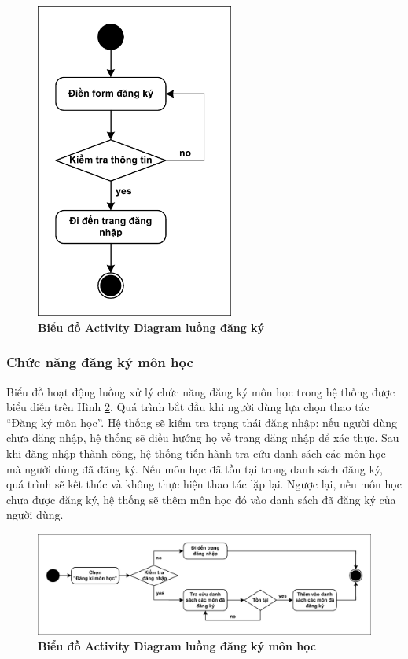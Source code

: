 \documentclass{article}
\begin{document}
	\begin{figure}[!ht]
		\centering
		\includegraphics[trim= 10pt 10pt 10pt 10pt, clip, width=6.5cm]{activity_fig310.pdf}
		\caption [Biểu đồ Activity Diagram luồng đăng ký]{\bfseries \fontsize{12pt}{0pt}\selectfont Biểu đồ Activity Diagram luồng đăng ký}
		\label{fig310}
	\end{figure}
	
	\subsubsection{Chức năng đăng ký môn học}
	
	Biểu đồ hoạt động luồng xử lý chức năng đăng ký môn học trong hệ thống được biểu diễn trên Hình \ref{fig311}. Quá trình bắt đầu khi người dùng lựa chọn thao tác “Đăng ký môn học”. Hệ thống sẽ kiểm tra trạng thái đăng nhập: nếu người dùng chưa đăng nhập, hệ thống sẽ điều hướng họ về trang đăng nhập để xác thực. Sau khi đăng nhập thành công, hệ thống tiến hành tra cứu danh sách các môn học mà người dùng đã đăng ký. Nếu môn học đã tồn tại trong danh sách đăng ký, quá trình sẽ kết thúc và không thực hiện thao tác lặp lại. Ngược lại, nếu môn học chưa được đăng ký, hệ thống sẽ thêm môn học đó vào danh sách đã đăng ký của người dùng.
		
	\begin{figure}[!ht]
		\centering
		\includegraphics[trim= 10pt 10pt 10pt 10pt, clip, width=16cm]{activity_fig311.pdf}
		\caption [Biểu đồ Activity Diagram luồng đăng ký môn học]{\bfseries \fontsize{12pt}{0pt}\selectfont Biểu đồ Activity Diagram luồng đăng ký môn học}
		\label{fig311}
	\end{figure}
	
\end{document}

